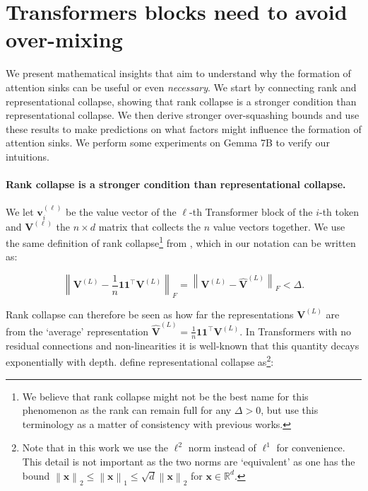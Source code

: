 \documentclass{article} %
\newcommand{\xb}{\mathbf{x}}
\newcommand{\vb}{\mathbf{v}}
\newcommand{\Vb}{\mathbf{V}}
\begin{document}
\section{Transformers blocks need to avoid over-mixing} 
\label{sec:theory}
We present mathematical insights that aim to understand why the formation of attention sinks can be useful or even \emph{necessary}. We start by connecting rank and representational collapse, showing that rank collapse is a stronger condition than representational collapse. We then derive stronger over-squashing bounds and use these results to make predictions on what factors might influence the formation of attention sinks. We perform some experiments on Gemma 7B to verify our intuitions.


\paragraph{Rank collapse is a stronger condition than representational collapse.}
We let $\vb_i^{(\ell)}$ be the value vector of the $\ell$-th Transformer block of the $i$-th token and $\Vb^{(\ell)}$ the $n \times d$ matrix that collects the $n$ value vectors together. We use the same definition of rank collapse\footnote{We believe that rank collapse might not be the best name for this phenomenon as the rank can remain full for any $\Delta > 0$, but use this terminology as a matter of consistency with previous works.} from \cite{wu2024role}, which in our notation can be written as:

\begin{equation}
    \left \lVert \Vb^{(L)} - \frac{1}{n} \mathbf{1} \mathbf{1}^\top \Vb^{(L)} \right \rVert_F = \left \lVert \Vb^{(L)} - \hat{\Vb}^{(L)} \right \rVert_F  < \Delta.
    \label{eq:dist}
\end{equation}

Rank collapse can therefore be seen as how far the representations $\Vb^{(L)}$ are from the `average' representation $\hat{\Vb}^{(L)} = \frac{1}{n} \mathbf{1} \mathbf{1}^\top \Vb^{(L)}$. In Transformers with no residual connections and non-linearities it is well-known that this quantity decays exponentially with depth. \cite{barbero2024transformers} define representational collapse as\footnote{Note that in this work we use the $\ell^2$ norm instead of $\ell^1$ for convenience. This detail is not important as the two norms are `equivalent' as one has the bound $\left\lVert \xb \right\rVert_2 \leq \left\lVert \xb \right\rVert_1 \leq \sqrt{d} \left\lVert \xb \right\rVert_2$ for $\xb \in \mathbb{R}^d$.}:
\end{document}
